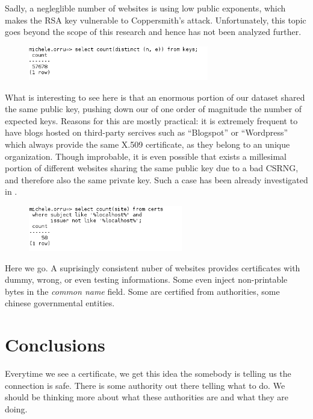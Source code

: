 Sadly, a negleglible number of websites is using low public exponents,
which makes the RSA key vulnerable to Coppersmith's attack. Unfortunately, this
topic goes beyond the scope of this research and hence has not been analyzed
further.

\begin{figure}[H]
  \includegraphics[width=0.7\textwidth]{n_count.png}
\end{figure}

What is interesting to see here is that an enormous portion of our dataset
shared the same public key, pushing down our of one order of magnitude the
number of expected keys. Reasons for this are mostly practical: it is extremely
frequent to have blogs hosted on third-party sercives such as ``Blogspot'' or
``Wordpress'' which always provide the same X.509 certificate, as they belong to
an unique organization.
Though improbable, it is even possible that exists a millesimal portion of
different websites sharing the same public key due to a
bad CSRNG, and therefore also the same private key. Such a case has been
already investigated in \cite{ron:whit}.

\begin{figure}[H]
  \includegraphics[width=0.6\textwidth]{localhost_certs.png}
\end{figure}

Here we go. A suprisingly consistent nuber of websites provides certificates
with dummy, wrong, or even testing informations. Some even inject non-printable
bytes in the \emph{common name} field.
Some are certified from authorities, some chinese governmental entities.



\chapter{Conclusions \label{conclusions}}
\noindent
Everytime we see a certificate, we get this idea the somebody is telling us the
connection is safe. There is some authority out there telling what to do.
We should be thinking more about what these authorities are and what they are
doing.

